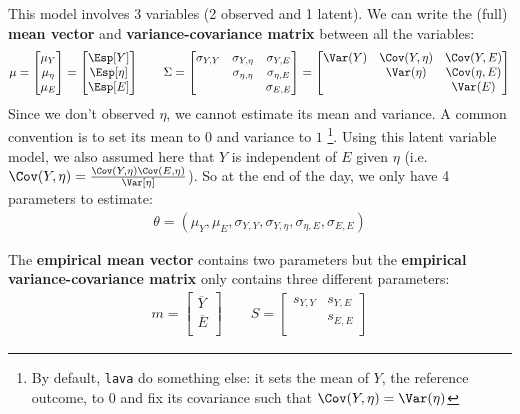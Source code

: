 \documentclass[12pt]{article}
\begin{document}
This model involves 3 variables (2 observed and 1 latent). We can
write the (full)  \textbf{mean vector} and \textbf{variance-covariance matrix} between all the variables:
\begin{align*}
\mu = \begin{bmatrix} 
\mu_Y \\ \mu_\eta \\ \mu_E \\
\end{bmatrix} = \begin{bmatrix} 
\Esp[Y] \\ \Esp[\eta] \\ \Esp[E] \\
\end{bmatrix} 
\qquad 
\Sigma = \begin{bmatrix} 
\sigma_{Y,Y} & \sigma_{Y,\eta} & \sigma_{Y,E} \\ & \sigma_{\eta,\eta} & \sigma_{\eta,E} \\ & & \sigma_{E,E}  \\
\end{bmatrix} = \begin{bmatrix} 
\Var(Y) & \Cov(Y,\eta) & \Cov(Y,E) \\ & \Var(\eta) & \Cov(\eta,E) \\ & & \Var(E)  \\
\end{bmatrix} 
\end{align*}
Since we don't observed \(\eta\), we cannot estimate its mean and
variance. A common convention is to set its mean to \(0\) and variance
to \(1\) \footnote{By default, \texttt{lava} do something else: it sets the
mean of \(Y\), the reference outcome, to 0 and fix its covariance such
that \(\Cov(Y,\eta)=\Var(\eta)\)}. Using this latent variable model, we
also assumed here that \(Y\) is independent of \(E\) given \(\eta\)
(i.e. \(\Cov(Y,\eta)=\frac{\Cov(Y,\eta)\Cov(E,\eta)}{\Var[\eta]}\)). So
at the end of the day, we only have 4 parameters to estimate: 
\begin{align*}
\theta = \left(\mu_Y,\mu_E, \sigma_{Y,Y}, \sigma_{Y,\eta}, \sigma_{\eta,E}, \sigma_{E,E}\right)
\end{align*}
\clearpage

The \textbf{empirical mean vector} contains two parameters but the \textbf{empirical
variance-covariance matrix} only contains three different parameters:
\begin{align*}
m = 
\begin{bmatrix} 
\overline{Y} \\ \overline{E} \\
\end{bmatrix} 
\qquad
S = 
\begin{bmatrix} 
s_{Y,Y} & s_{Y,E} \\ & s_{E,E} \\
\end{bmatrix} 
\end{align*}
\end{document}
